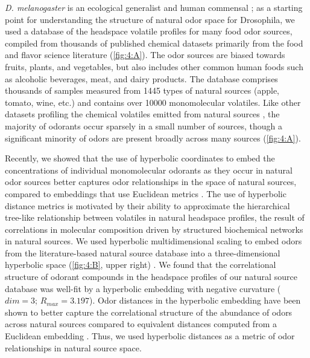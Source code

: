 \documentclass[12pt]{caltech_thesis}
\renewcommand{\cite}{{ }\autocite}
\begin{document}
\begin{refsection}
\textit{D. melanogaster} is an ecological generalist and human commensal\cite{DrosophilaEcology}; as a starting point for understanding the structure of natural odor space for Drosophila, we used a database of the headspace volatile profiles for many food odor sources, compiled from thousands of published chemical datasets primarily from the food and flavor science literature (\cref{fig:4:A}).
The odor sources are biased towards fruits, plants, and vegetables, but also includes other common human foods such as alcoholic beverages, meat, and dairy products.
The database comprises thousands of samples measured from \num{1445} types of natural sources (apple, tomato, wine, etc.) and contains over \num{10000} monomolecular volatiles.
Like other datasets profiling the chemical volatiles emitted from natural sources\cite{OlderFoodVolatileReview}, the majority of odorants occur sparsely in a small number of sources, though a significant minority of odors are present broadly across many sources (\cref{fig:4:A}).

Recently, we showed that the use of hyperbolic coordinates to embed the concentrations of individual monomolecular odorants as they occur in natural odor sources better captures odor relationships in the space of natural sources, compared to embeddings that use Euclidean metrics\cite{HyperbolicOdorsBees,HyperbolicOdors}.
The use of hyperbolic distance metrics is motivated by their ability to approximate the hierarchical tree-like relationship between volatiles in natural headspace profiles, the result of correlations in molecular composition driven by structured biochemical networks in natural sources.
We used hyperbolic multidimensional scaling to embed odors from the literature-based natural source database into a three-dimensional hyperbolic space (\cref{fig:4:B}, upper right)\cite{Praturu2022,Zhou2021}.
We found that the correlational structure of odorant compounds in the headspace profiles of our natural source database was well-fit by a hyperbolic embedding with negative curvature ($dim{=}3$; $R_{max}{=}\num{3.197}$).
Odor distances in the hyperbolic embedding have been shown to better capture the correlational structure of the abundance of odors across natural sources compared to equivalent distances computed from a Euclidean embedding\cite{Ghaninia2022,Zhou2018}.
Thus, we used hyperbolic distances as a metric of odor relationships in natural source space. 


\end{refsection}
\end{document}
